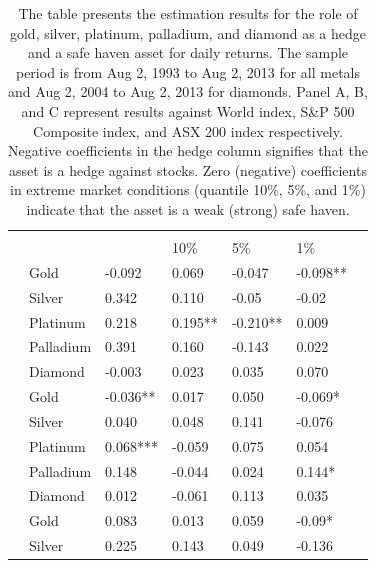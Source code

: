 \documentclass[preprint,authoryear,11pt]{elsarticle}
\begin{document}
\begin{table}[htp!]
	\caption{\newline The table presents the estimation results for the role of gold, silver, platinum, palladium, and diamond as a hedge and a safe haven asset for daily returns. The sample period is from Aug 2, 1993 to Aug 2, 2013 for all metals and Aug 2, 2004 to Aug 2, 2013 for diamonds. Panel A, B, and C represent results against World index, S\&P 500 Composite index, and ASX 200 index respectively. Negative coefficients in the hedge column signifies that the asset is a hedge against stocks. Zero (negative) coefficients in extreme market conditions (quantile 10\%, 5\%, and 1\%) indicate that the asset is a weak (strong) safe haven.}
	\label{tab:eq123_results}
	\renewcommand\arraystretch{0.65}
	\begin{tabularx}{\linewidth}{*{6}{>{\arraybackslash\small}p{.14\linewidth}}S[table-format=1.3]}
		\hline
		      &     &   &  \\
		      &    &        & 10\% & 5\% & 1\% \\
		\hline
		 & Gold  & -0.092 & 0.069 & -0.047 & -0.098** \\
		                                & Silver & 0.342 & 0.110 & -0.05 & -0.02 \\
		                                & Platinum & 0.218 & 0.195** & -0.210** & 0.009 \\
		                                & Palladium & 0.391 & 0.160 & -0.143 & 0.022 \\
		                                & Diamond & -0.003 & 0.023 & 0.035 & 0.070\\
		\hline
	      & Gold       & -0.036** & 0.017  & 0.050 & -0.069* \\
                                     & Silver     & 0.040    & 0.048  & 0.141 & -0.076 \\
		                             & Platinum   & 0.068*** & -0.059 & 0.075 & 0.054 \\
		                             & Palladium  & 0.148    & -0.044 & 0.024 & 0.144* \\
		                             & Diamond    & 0.012    & -0.061 & 0.113 & 0.035 \\
		\hline
		 & Gold & 0.083 & 0.013 & 0.059 & -0.09* \\
		                            & Silver & 0.225 & 0.143 & 0.049 & -0.136 \\

\end{tabularx}
\end{table}
\end{document}
